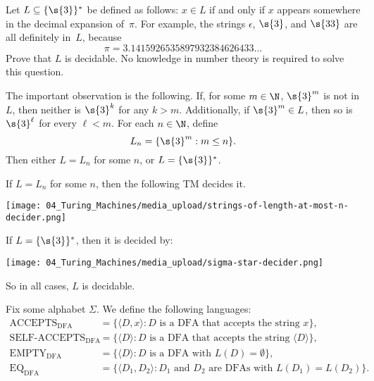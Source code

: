 \begin{flex}
\begin{exercise} \label{exercise:Decidable-language-based-on-pi}
    Let $L \subseteq \{\s{3}\}^*$ be defined as follows:  $x \in L$ if and only if $x$ appears somewhere in the decimal expansion of~$\pi$.  For example, the strings $\epsilon$, $\s{3}$, and $\s{33}$ are all definitely in~$L$, because
    \[
         \pi = 3.1415926535897932384626433\dots
    \]
    Prove that $L$ is decidable. No knowledge in number theory is required to solve this question.
\end{exercise}


\begin{solution}
The important observation is the following. If, for some $m \in \N$, $\s{3}^m$ is not in $L$, then neither is $\s{3}^{k}$ for any $k > m$. Additionally, if $\s{3}^m \in L$, then so is $\s{3}^{\ell}$ for every $\ell < m$. For each $n \in \N$, define 
\[
L_n = \{\s{3}^m : m \leq n\}.
\]
Then either $L = L_n$ for some $n$, or $L = \{\s{3}\}^*$.

If $L = L_n$ for some $n$, then the following TM decides it.
\begin{center}
    \texttt{[image: 04\_Turing\_Machines/media\_upload/strings-of-length-at-most-n-decider.png]}
\end{center}

If $L = \{\s{3}\}^*$, then it is decided by:
\begin{center}
    \texttt{[image: 04\_Turing\_Machines/media\_upload/sigma-star-decider.png]}
\end{center}
So in all cases, $L$ is decidable.
\end{solution}
\end{flex}


\begin{definition} \label{definition:Languages-related-to-encodings-of-DFAs}
Fix some alphabet $\Sigma$. We define the following languages:
\begin{align*}
    \text{ACCEPTS}_\text{DFA} & = \{\langle D,x \rangle : \text{$D$ is a DFA that accepts the string $x$}\}, \\
    \text{SELF-ACCEPTS}_\text{DFA} & = \{\langle D \rangle : \text{$D$ is a DFA that accepts the string $\langle D \rangle$}\}, \\
    \text{EMPTY}_\text{DFA} & = \{\langle D \rangle : \text{$D$ is a DFA with $L(D) = \emptyset$} \}, \\
    \text{EQ}_\text{DFA} & = \{ \langle D_1,D_2 \rangle : \text{$D_1$ and $D_2$ are DFAs with $L(D_1) = L(D_2)$} \}.
\end{align*}
\end{definition}


